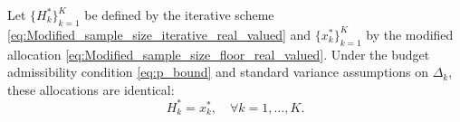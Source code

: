 
\begin{theorem}
\label{thm:MFMC_modified_Iterative_RealValued_Sample_Size}
Let $\{H_k^*\}_{k=1}^K$ be defined by the iterative scheme \eqref{eq:Modified_sample_size_iterative_real_valued} and $\{x_k^*\}_{k=1}^K$ by the modified allocation \eqref{eq:Modified_sample_size_floor_real_valued}. Under the budget admissibility condition \eqref{eq:p_bound} and standard variance assumptions on $\Delta_k$, these allocations are identical:
\[
H_k^* = x_k^*, \quad \forall k = 1,\ldots,K.
\]
\end{theorem}






